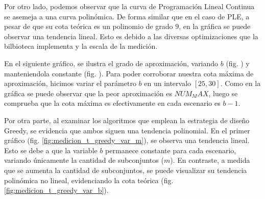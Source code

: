 Por otro lado, podemos observar que la curva de Programación Lineal Continua se asemeja a una curva polinómica. De forma similar que en el caso de PLE, a pesar de que su cota teórica es un polinomio de grado $9$, en la gráfica se puede observar una tendencia lineal. Esto es debido a las diversas optimizaciones que la bilbioteca implementa y la escala de la medición.

En el siguiente gráfico, se ilustra el grado de aproximación, variando $b$ (fig. \label{medicion-plc-var-b}) y manteniendola constante (fig. \label{medicion-plc-cons-b}). Para poder corroborar nuestra cota máxima de aproximación, hicimos variar el parámetro $b$ en un intervalo $\left[25,30\right]$. Como en la gráfica se puede observar que la peor aproximación es $NUM_MAX$, luego se comprueba que la cota máxima es efectivamente en cada escenario es $b-1$.

Por otra parte, al examinar los algoritmos que emplean la estrategia de diseño Greedy, se evidencia que ambos siguen una tendencia polinomial. En el primer gráfico (fig. \ref{fig:medicion_t_greedy_var_m}), se observa una tendencia lineal. Esto se debe a que la variable $b$ permanece constante para cada escenario, variando únicamente la cantidad de subconjuntos ($m$). En contraste, a medida que se aumenta la cantidad de subconjuntos, se puede visualizar su tendencia polinómica no lineal, evidenciando la cota teórica (fig. \ref{fig:medicion_t_greedy_var_b}).

